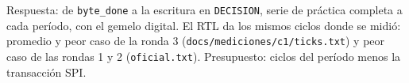 {\footnotesize Respuesta: de \texttt{byte\_done} a la escritura en \texttt{DECISION}, serie de práctica completa a cada período, con el gemelo digital. El RTL da los mismos ciclos donde se midió: promedio y peor caso de la ronda 3 (\texttt{docs/mediciones/c1/ticks.txt}) y peor caso de las rondas 1 y 2 (\texttt{oficial.txt}). Presupuesto: ciclos del período menos la transacción SPI.\par}
